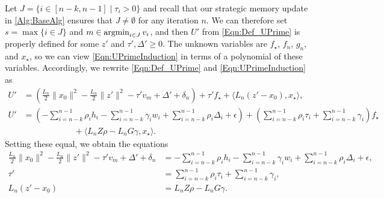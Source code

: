 \documentclass[11pt]{article}
\numberwithin{equation}{section}
\newcommand{\argmin}{\operatornamewithlimits{argmin}}
\newcommand{\Ucoef}{\rho}
\newcommand{\Wcoef}{\gamma}
\newcommand{\idxArgmin}{m}
\newcommand{\idxLastSuccess}{s}
\newcommand{\idxMem}{k}
\newcommand{\idxSetSuccess}{J}
\newcommand{\ip}[2]{\sum_{i={n-\idxMem}}^{n-1} {#1}_i {#2}_i}
\newcommand{\fullSum}[1]{\sum_{i={n-\idxMem}}^{n-1} {#1}_i}
\newcommand{\norm}[1]{\|{#1}\|}
\theoremstyle{definition}
\theoremstyle{plain}
\theoremstyle{definition}
\begin{document}
Let $\idxSetSuccess = \{i \in [n-\idxMem, n-1] \mid \tau_i > 0\}$ and recall that our strategic memory update in \cref{Alg:BaseAlg} ensures that $\idxSetSuccess \neq \emptyset$ for any iteration $n$. We can therefore set $\idxLastSuccess = \max\{i \in \idxSetSuccess\}$ and $\idxArgmin \in \argmin_{i \in \idxSetSuccess} v_i$, and then $U'$ from \eqref{Eqn:Def_UPrime} is properly defined for some $z'$ and $\tau',\Delta' \geq 0$. The unknown variables are $f_\star$, $f_n$, $g_n$, and $x_\star$, so we can view \eqref{Eqn:UPrimeInduction} in terms of a polynomial of these variables. Accordingly, we rewrite \eqref{Eqn:Def_UPrime} and \eqref{Eqn:UPrimeInduction} as
\begin{align*}
    U' &= \left(\frac{L_n}{2}\norm{x_0}^2 - \frac{L_n}{2}\norm{z'}^2 - \tau' v_\idxArgmin + \Delta' + \delta_n \right) + \tau' f_\star + \langle L_n(z'-x_0), x_\star \rangle,  \\
    U' &= \left(-\ip{\Ucoef}{h} - \ip{\Wcoef}{w} + \ip{\Ucoef}{\Delta} + \epsilon \right) + \left(\ip{\Ucoef}{\tau} + \fullSum{\Wcoef} \right) f_\star \\
    & \qquad \qquad \qquad + \langle L_n Z \Ucoef - L_n G \Wcoef, x_\star \rangle.
\end{align*}
Setting these equal, we obtain the equations
\begin{align}
    \frac{L_n}{2}\norm{x_0}^2 - \frac{L_n}{2}\norm{z'}^2 - \tau' v_\idxArgmin + \Delta' + \delta_n & = -\ip{\Ucoef}{h}  - \ip{\Wcoef}{w} + \ip{\Ucoef}{\Delta} + \epsilon , \label{Eqn:Derivation_Eq1} \\ 
    \tau' & = \ip{\Ucoef}{\tau} + \fullSum{\Wcoef} , \label{Eqn:Derivation_Eq2} \\
    L_n(z' - x_0) &= L_n Z \Ucoef - L_n G \Wcoef. \label{Eqn:Derivation_Eq3}
\end{align}
\end{document}
